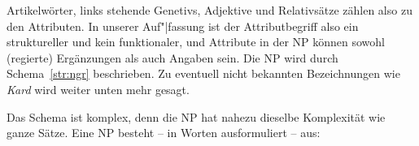 
Artikelwörter, links stehende Genetivs, Adjektive und Relativsätze zählen also zu den Attributen.
In unserer Auf"|fassung ist der Attributbegriff also ein struktureller und kein funktionaler, und Attribute in der NP können sowohl (regierte) Ergänzungen als auch Angaben sein.
Die NP wird durch Schema~\ref{str:ngr} beschrieben.
Zu eventuell nicht bekannten Bezeichnungen wie \textit{Kard} wird weiter unten mehr gesagt.



Das Schema ist komplex, denn die NP hat nahezu dieselbe Komplexität wie ganze Sätze.
Eine NP besteht -- in Worten ausformuliert -- aus:


